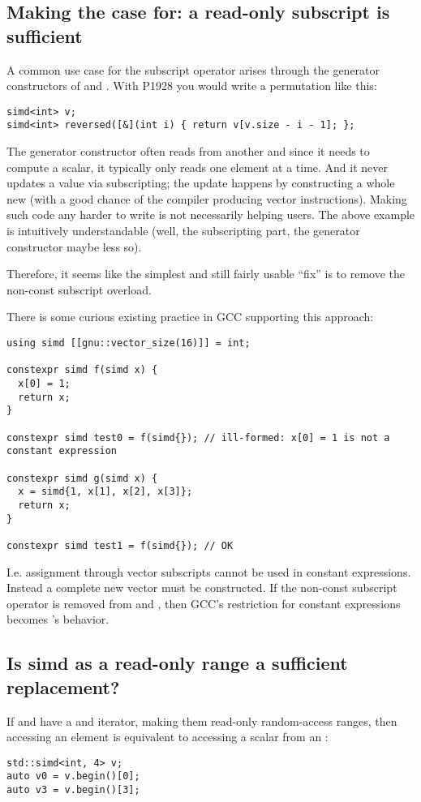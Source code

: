 \subsection{Making the case for: a read-only subscript is sufficient}

A common use case for the subscript operator arises through the generator
constructors of \simd and \mask.
With P1928 you would write a permutation like this:
\medskip\begin{lstlisting}[style=Vc]
simd<int> v;
simd<int> reversed([&](int i) { return v[v.size - i - 1]; };
\end{lstlisting}
The generator constructor often reads from another \simd and since it needs to
compute a scalar, it typically only reads one element at a time.
And it never updates a value via subscripting; the update happens by
constructing a whole new \simd (with a good chance of the compiler producing
vector instructions).
Making such code any harder to write is not necessarily helping users.
The above example is intuitively understandable (well, the subscripting part,
the generator constructor maybe less so).

Therefore, it seems like the simplest and still fairly usable “fix” is to
remove the non-const subscript overload.

There is some curious existing practice in GCC supporting this approach:
\medskip\begin{lstlisting}[style=Vc]
using simd [[gnu::vector_size(16)]] = int;

constexpr simd f(simd x) {
  x[0] = 1;
  return x;
}

constexpr simd test0 = f(simd{}); // ill-formed: x[0] = 1 is not a constant expression

constexpr simd g(simd x) {
  x = simd{1, x[1], x[2], x[3]};
  return x;
}

constexpr simd test1 = f(simd{}); // OK
\end{lstlisting}
I.e. assignment through vector subscripts cannot be used in constant expressions.
Instead a complete new vector must be constructed.
If the non-const subscript operator is removed from \simd and \mask, then GCC's
restriction for constant expressions becomes \std\simd's behavior.


\subsection{Is simd as a read-only range a sufficient replacement?}

If \simd and \mask have a  and  iterator, making
them read-only random-access ranges, then accessing an element is
equivalent to accessing a scalar from an :
\medskip\begin{lstlisting}[style=Vc]
std::simd<int, 4> v;
auto v0 = v.begin()[0];
auto v3 = v.begin()[3];
\end{lstlisting}

